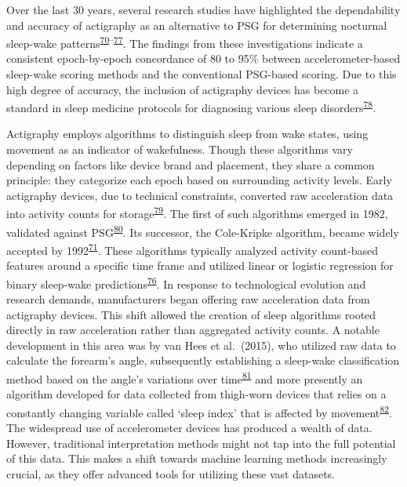 \documentclass[
  10pt,
]{scrbook}
\begin{document}
Over the last 30 years, several research studies have highlighted the
dependability and accuracy of actigraphy as an alternative to PSG for
determining nocturnal sleep-wake
patterns\textsuperscript{\protect\hyperlink{ref-sadeh_activity-based_1994}{70}--\protect\hyperlink{ref-granovsky_actigraphy-based_2018}{77}}.
The findings from these investigations indicate a consistent
epoch-by-epoch concordance of 80 to 95\% between accelerometer-based
sleep-wake scoring methods and the conventional PSG-based scoring. Due
to this high degree of accuracy, the inclusion of actigraphy devices has
become a standard in sleep medicine protocols for diagnosing various
sleep disorders\textsuperscript{\protect\hyperlink{ref-smith_2018}{78}}.

Actigraphy employs algorithms to distinguish sleep from wake states,
using movement as an indicator of wakefulness. Though these algorithms
vary depending on factors like device brand and placement, they share a
common principle: they categorize each epoch based on surrounding
activity levels. Early actigraphy devices, due to technical constraints,
converted raw acceleration data into activity counts for
storage\textsuperscript{\protect\hyperlink{ref-neishabouri_2022}{79}}.
The first of such algorithms emerged in 1982, validated against
PSG\textsuperscript{\protect\hyperlink{ref-webster_activity-based_1982}{80}}.
Its successor, the Cole-Kripke algorithm, became widely accepted by
1992\textsuperscript{\protect\hyperlink{ref-cole_automatic_1992}{71}}.
These algorithms typically analyzed activity count-based features around
a specific time frame and utilized linear or logistic regression for
binary sleep-wake
predictions\textsuperscript{\protect\hyperlink{ref-sazonov_activity-based_2004}{76}}.
In response to technological evolution and research demands,
manufacturers began offering raw acceleration data from actigraphy
devices. This shift allowed the creation of sleep algorithms rooted
directly in raw acceleration rather than aggregated activity counts. A
notable development in this area was by van Hees et al.~(2015), who
utilized raw data to calculate the forearm's angle, subsequently
establishing a sleep-wake classification method based on the angle's
variations over
time\textsuperscript{\protect\hyperlink{ref-hees_novel_2015}{81}} and
more presently an algorithm developed for data collected from thigh-worn
devices that relies on a constantly changing variable called `sleep
index' that is affected by
movement\textsuperscript{\protect\hyperlink{ref-johansson_development_2023}{82}}.
The widespread use of accelerometer devices has produced a wealth of
data. However, traditional interpretation methods might not tap into the
full potential of this data. This makes a shift towards machine learning
methods increasingly crucial, as they offer advanced tools for utilizing
these vast datasets.
\end{document}
